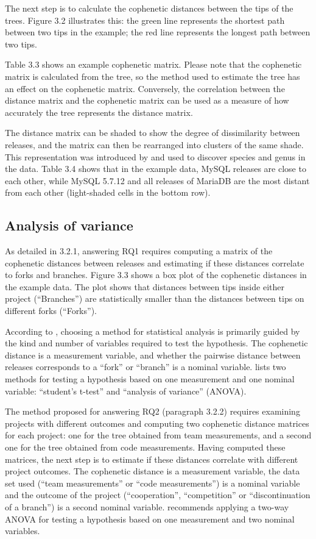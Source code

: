The next step is to calculate the cophenetic distances between the tips of the trees. Figure 3.2 illustrates this: the green line represents the shortest path between two tips in the example; the red line represents the longest path between two tips.

Table 3.3 shows an example cophenetic matrix. Please note that the cophenetic matrix is calculated from the tree, so the method used to estimate the tree has an effect on the cophenetic matrix. Conversely, the correlation between the distance matrix and the cophenetic matrix can be used as a measure of how accurately the tree represents the distance matrix.

The distance matrix can be shaded to show the degree of dissimilarity between releases, and the matrix can then be rearranged into clusters of the same shade. This representation was introduced by \citet{Sneath1962a} and used to discover species and genus in the data. Table 3.4 shows that in the example data, MySQL releases are close to each other, while MySQL 5.7.12 and all releases of MariaDB are the most distant from each other (light-shaded cells in the bottom row).

\subsection{Analysis of variance}
As detailed in 3.2.1, answering RQ1 requires computing a matrix of the cophenetic distances between releases and estimating if these distances correlate to forks and branches. Figure 3.3 shows a box plot of the cophenetic distances in the example data. The plot shows that distances between tips inside either project (“Branches”) are statistically smaller than the distances between tips on different forks (“Forks”).

According to \citet{McDonald2014b}, choosing a method for statistical analysis is primarily guided by the kind and number of variables required to test the hypothesis. The cophenetic distance is a measurement variable, and whether the pairwise distance between releases corresponds to a “fork” or “branch” is a nominal variable. \citet{McDonald2014b} lists two methods for testing a hypothesis based on one measurement and one nominal variable: “student's t-test” and “analysis of variance” (ANOVA).

The method proposed for answering RQ2 (paragraph 3.2.2) requires examining projects with different outcomes and computing two cophenetic distance matrices for each project: one for the tree obtained from team measurements, and a second one for the tree obtained from code measurements. Having computed these matrices, the next step is to estimate if these distances correlate with different project outcomes. The cophenetic distance is a measurement variable, the data set used (“team measurements” or “code measurements”) is a nominal variable and the outcome of the project (“cooperation”, “competition” or “discontinuation of a branch”) is a second nominal variable. \citet{McDonald2014b} recommends applying a two-way ANOVA for testing a hypothesis based on one measurement and two nominal variables.

